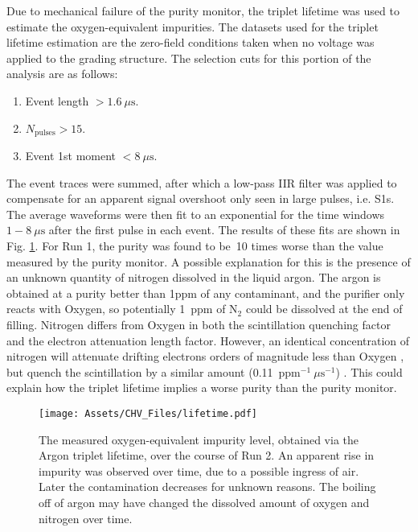 Due to mechanical failure of the purity monitor, the triplet lifetime was used to estimate the oxygen-equivalent impurities. 
The datasets used for the triplet lifetime estimation are the zero-field conditions taken when no voltage was applied to the grading structure. 
The selection cuts for this portion of the analysis are as follows:

\begin{enumerate}
    \item Event length $> 1.6~\mu \mathrm{s}$.
    \item $N_\mathrm{pulses}>15$.
    \item Event 1st moment $< 8~\mu \mathrm{s}$.
\end{enumerate}

The event traces were summed, after which a low-pass IIR filter was applied to compensate for an apparent signal overshoot only seen in large pulses, i.e. S1s.
The average waveforms were then fit to an exponential for the time windows $1 -8~\mu \mathrm{s}$ after the first pulse in each event.
The results of these fits are shown in Fig. \ref{fig:puritytime}.
For Run 1, the purity was found to be~10 times worse than the value measured by the purity monitor. 
A possible explanation for this is the presence of an unknown quantity of nitrogen dissolved in the liquid argon.
The argon is obtained at a purity better than 1ppm of any contaminant, and the purifier only reacts with Oxygen, so potentially 1~ppm of N$_2$ could be dissolved at the end of filling.
Nitrogen differs from Oxygen in both the scintillation quenching factor and the electron attenuation length factor.
However, an identical concentration of nitrogen will attenuate drifting electrons orders of magnitude less than Oxygen \cite{biller_effects_1989}, but quench the scintillation by a similar amount (0.11~ppm$^{-1}~\mu \mathrm{s}^{-1}$) \cite{acciarri_effects_2010}.
This could explain how the triplet lifetime implies a worse purity than the purity monitor.

\begin{figure}
\texttt{[image: Assets/CHV\_Files/lifetime.pdf]}
\caption[The measured oxygen-equivalent impurity level, obtained via the Argon triplet lifetime, over the course of CHV Run 2.]%
{The measured oxygen-equivalent impurity level, obtained via the Argon triplet lifetime, over the course of Run 2.
An apparent rise in impurity was observed over time, due to a possible ingress of air.
Later the contamination decreases for unknown reasons.
The boiling off of argon may have changed the dissolved amount of oxygen and nitrogen over time.}
\label{fig:puritytime}
\end{figure}

